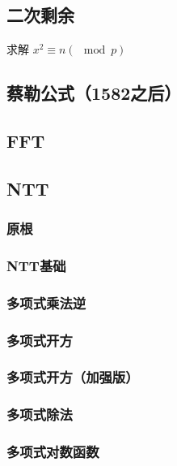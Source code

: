 \documentclass[twoside,a4paper]{article}
\begin{document}
\subsection{二次剩余}
求解 $x^{2} \equiv n (\mod p)$


\subsection{蔡勒公式（1582之后）}



\subsection{FFT}


\subsection{NTT}
\subsubsection{原根}

\subsubsection{NTT基础}

\subsubsection{多项式乘法逆}

\subsubsection{多项式开方}

\subsubsection{多项式开方（加强版）}

\subsubsection{多项式除法}

\subsubsection{多项式对数函数}

\end{document}

